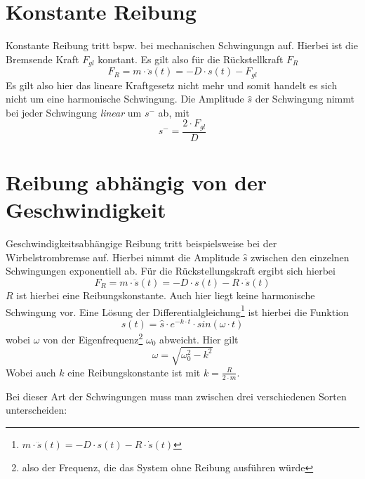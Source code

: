 	\section{Konstante Reibung} 
Konstante Reibung tritt bspw. bei mechanischen Schwingungn auf. Hierbei ist die Bremsende Kraft \(F_{gl}\) konstant. Es gilt also für die Rückstellkraft \(F_R\)
	\begin{equation}
		F_R = m \cdot \ddot{s}(t) = - D \cdot s(t) - F_{gl}
	\end{equation}
Es gilt also hier das lineare Kraftgesetz nicht mehr und somit handelt es sich nicht um eine harmonische Schwingung. Die Amplitude \(\hat{s}\) der Schwingung nimmt bei jeder Schwingung \textit{linear} um \(s^{-}\) ab, mit
	\begin{equation}
		s^{-} = \frac{2 \cdot F_{gl}}{D}
	\end{equation}
	
	
	\section{Reibung abhängig von der Geschwindigkeit} 
Geschwindigkeitsabhängige Reibung tritt beispielsweise bei der Wirbelstrombremse auf. Hierbei nimmt die Amplitude \(\hat{s}\) zwischen den einzelnen Schwingungen exponentiell ab. Für die Rückstellungskraft ergibt sich hierbei
	\begin{equation}
		F_R = m \cdot \ddot{s}(t) = - D \cdot s(t) - R \cdot \dot{s}(t)
	\end{equation}
\(R\) ist hierbei eine Reibungskonstante. Auch hier liegt keine harmonische Schwingung vor. Eine Lösung der Differentialgleichung\footnote{\(m \cdot \ddot{s}(t) = - D \cdot s(t) - R \cdot \dot{s}(t)\)} ist hierbei die Funktion
	\begin{equation}
		s(t) = \hat{s} \cdot e^{- k \cdot t} \cdot sin(\omega \cdot t)
	\end{equation}
wobei \(\omega\) von der Eigenfrequenz\footnote{also der Frequenz, die das System ohne Reibung ausführen würde}  \(\omega_0\) abweicht. Hier gilt
	\begin{equation}
		\omega = \sqrt{\omega_0^2 - k^2}
	\end{equation}
Wobei auch \(k\) eine Reibungskonstante ist mit \(k = \frac{R}{2 \cdot m}\).

Bei dieser Art der Schwingungen muss man zwischen drei verschiedenen Sorten unterscheiden:
	
